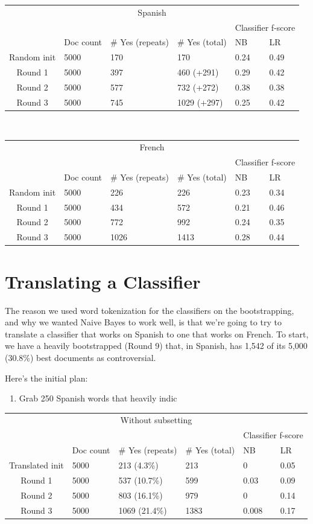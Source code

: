 \documentclass[11pt]{article} %
\begin{document}
\begin{tabular}{|c|l|l|l|l|l|}
\multicolumn{6}{|c|}{Spanish} \\
\rowcolor{gray!50} &&&& \multicolumn{2}{|c|}{Classifier f-score} \\
\rowcolor{gray!50} & Doc count & \# Yes (repeats) & \# Yes (total) & NB & LR \\
Random init & 5000 & 170 & 170 & 0.24 & 0.49 \\
Round 1 & 5000 & 397 & 460 (+291) & 0.29 & 0.42 \\
Round 2 & 5000 & 577 & 732 (+272) & 0.38 & 0.38 \\
Round 3 & 5000 & 745 & 1029 (+297) & 0.25 & 0.42 \\
\end{tabular} \\
\begin{tabular}{|c|l|l|l|l|l|}
\multicolumn{6}{|c|}{French} \\
\rowcolor{gray!50} &&&& \multicolumn{2}{|c|}{Classifier f-score} \\
\rowcolor{gray!50} & Doc count & \# Yes (repeats) & \# Yes (total) & NB & LR \\
Random init & 5000 & 226 & 226 & 0.23 & 0.34 \\
Round 1 & 5000 & 434 & 572 & 0.21 & 0.46 \\
Round 2 & 5000 & 772 & 992 & 0.24 & 0.35 \\
Round 3 & 5000 & 1026 & 1413 & 0.28 & 0.44 \\
\end{tabular}

\section{Translating a Classifier}
The reason we used word tokenization for the classifiers on the bootstrapping, and why we wanted Naive Bayes to work well, is that we're going to try to translate a classifier that works on Spanish to one that works on French. To start, we have a heavily bootstrapped (Round 9) that, in Spanish, has 1,542 of its 5,000 (30.8\%) best documents as controversial.

Here's the initial plan:
\begin{enumerate}
\item Grab 250 Spanish words that heavily indic
\end{enumerate}


\begin{tabular}{|c|l|l|l|l|l|}
\multicolumn{6}{|c|}{Without subsetting} \\
\rowcolor{gray!50} &&&& \multicolumn{2}{|c|}{Classifier f-score} \\
\rowcolor{gray!50} & Doc count & \# Yes (repeats) & \# Yes (total) & NB & LR \\
Translated init & 5000 & 213 (4.3\%) & 213 & 0 & 0.05 \\
Round 1 & 5000 &  537 (10.7\%) & 599 & 0.03 & 0.09 \\
Round 2 & 5000 &  803 (16.1\%) & 979 & 0 & 0.14 \\
Round 3 & 5000 & 1069 (21.4\%) & 1383 & 0.008 & 0.17 \\
\end{tabular}
\end{document}

